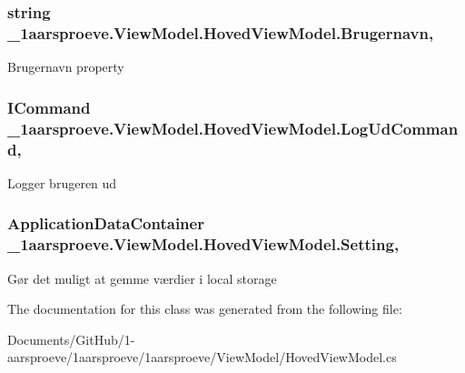 \subsubsection[{Brugernavn}]{\setlength{\rightskip}{0pt plus 5cm}string \+\_\+1aarsproeve.\+View\+Model.\+Hoved\+View\+Model.\+Brugernavn\hspace{0.3cm}{\ttfamily [get]}, {\ttfamily [set]}}\label{class__1aarsproeve_1_1_view_model_1_1_hoved_view_model_a48f0c876a1e3cd598fe3c4c7c65a760d}


Brugernavn property 

\hypertarget{class__1aarsproeve_1_1_view_model_1_1_hoved_view_model_ae541527e8e9063cc3337b229b93c7e48}{}
\subsubsection[{Log\+Ud\+Command}]{\setlength{\rightskip}{0pt plus 5cm}I\+Command \+\_\+1aarsproeve.\+View\+Model.\+Hoved\+View\+Model.\+Log\+Ud\+Command\hspace{0.3cm}{\ttfamily [get]}, {\ttfamily [set]}}\label{class__1aarsproeve_1_1_view_model_1_1_hoved_view_model_ae541527e8e9063cc3337b229b93c7e48}


Logger brugeren ud 

\hypertarget{class__1aarsproeve_1_1_view_model_1_1_hoved_view_model_afbb2eb2f33bdb6defe9979b80c6e79ff}{}
\subsubsection[{Setting}]{\setlength{\rightskip}{0pt plus 5cm}Application\+Data\+Container \+\_\+1aarsproeve.\+View\+Model.\+Hoved\+View\+Model.\+Setting\hspace{0.3cm}{\ttfamily [get]}, {\ttfamily [set]}}\label{class__1aarsproeve_1_1_view_model_1_1_hoved_view_model_afbb2eb2f33bdb6defe9979b80c6e79ff}


Gør det muligt at gemme værdier i local storage 



The documentation for this class was generated from the following file\+:\begin{DoxyCompactItemize}
\item 
Documents/\+Git\+Hub/1-\/aarsproeve/1aarsproeve/1aarsproeve/\+View\+Model/Hoved\+View\+Model.\+cs\end{DoxyCompactItemize}
